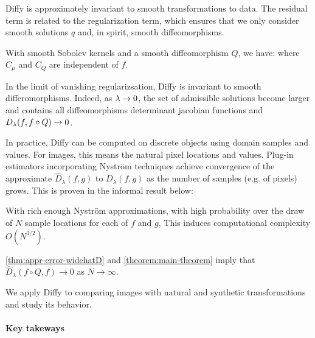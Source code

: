 Diffy is approximately invariant to smooth transformations to data. The residual term is related to the regularization term, which ensures that we only consider smooth solutions $q$ and, in spirit, smooth diffeomorphisms.
\begin{mdframed}
\begin{informaltheorem}
With smooth Sobolev kernels and a smooth diffeomorphism $Q$, we have:
where $C_\mu$ and $C_Q$ are independent of $f$.
\end{informaltheorem}
\end{mdframed}
\noindent In the limit of vanishing regularizsation, Diffy is invariant to smooth differomorphisms. Indeed, as $\lambda \to 0$, the set of admissible solutions become larger and contains all diffeomorphisms determinant jacobian functions and $D_\lambda(f, f\circ Q)\to 0$.

In practice, Diffy can be computed on discrete objects using domain samples and values. For images, this means the natural pixel locations and values. Plug-in estimators incorporating Nyström techniques achieve convergence of the approximate $\hat D_\lambda(f, g)$ to $D_\lambda(f, g)$ as the number of samples (e.g. of pixels) grows. This is proven in the informal result below:
\begin{mdframed}
\begin{informaltheorem}
With rich enough Nyström approximations, with high probability over the draw of $N$ sample locations for each of $f$ and $g$,
This induces computational complexity $O(N^{3/2})$.
\end{informaltheorem}
\end{mdframed}
\noindent \cref{thm:appr-error-widehatD} and \cref{theorem:main-theorem} imply that $\hat D_\lambda(f\circ Q, f)\to 0$ as $N\to \infty$.

We apply Diffy to comparing images with natural and synthetic transformations and study its behavior.

\paragraph{Key takeways}

